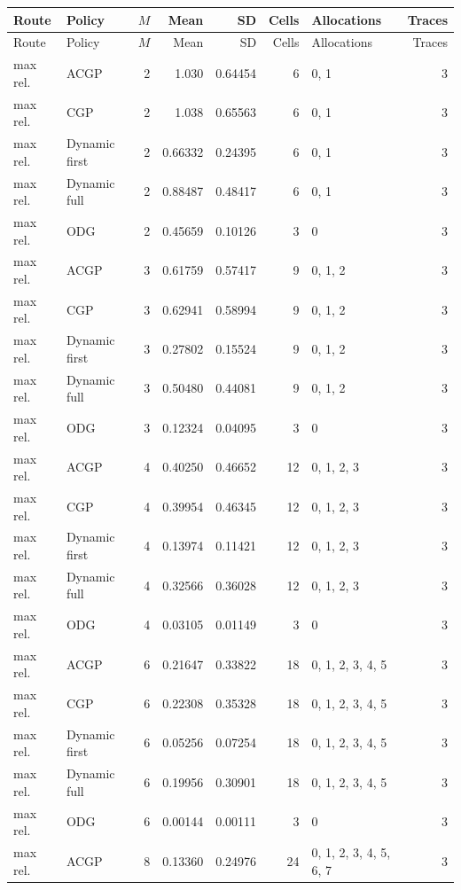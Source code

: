 \documentclass[10pt,a4paper]{article}
\begin{document}
\tiny\setlength{\tabcolsep}{2pt}\begin{longtable}{@{}p{23mm}p{29mm}rrrrp{36mm}r@{}}
\toprule Route & Policy & $M$ & Mean & SD & Cells & Allocations & Traces \\ \midrule\endfirsthead
\toprule Route & Policy & $M$ & Mean & SD & Cells & Allocations & Traces \\ \midrule\endhead
\bottomrule\endfoot
max rel. & ACGP & 2 & 1.030 & 0.64454 & 6 & 0, 1 & 3 \\
max rel. & CGP & 2 & 1.038 & 0.65563 & 6 & 0, 1 & 3 \\
max rel. & Dynamic first & 2 & 0.66332 & 0.24395 & 6 & 0, 1 & 3 \\
max rel. & Dynamic full & 2 & 0.88487 & 0.48417 & 6 & 0, 1 & 3 \\
max rel. & ODG & 2 & 0.45659 & 0.10126 & 3 & 0 & 3 \\
max rel. & ACGP & 3 & 0.61759 & 0.57417 & 9 & 0, 1, 2 & 3 \\
max rel. & CGP & 3 & 0.62941 & 0.58994 & 9 & 0, 1, 2 & 3 \\
max rel. & Dynamic first & 3 & 0.27802 & 0.15524 & 9 & 0, 1, 2 & 3 \\
max rel. & Dynamic full & 3 & 0.50480 & 0.44081 & 9 & 0, 1, 2 & 3 \\
max rel. & ODG & 3 & 0.12324 & 0.04095 & 3 & 0 & 3 \\
max rel. & ACGP & 4 & 0.40250 & 0.46652 & 12 & 0, 1, 2, 3 & 3 \\
max rel. & CGP & 4 & 0.39954 & 0.46345 & 12 & 0, 1, 2, 3 & 3 \\
max rel. & Dynamic first & 4 & 0.13974 & 0.11421 & 12 & 0, 1, 2, 3 & 3 \\
max rel. & Dynamic full & 4 & 0.32566 & 0.36028 & 12 & 0, 1, 2, 3 & 3 \\
max rel. & ODG & 4 & 0.03105 & 0.01149 & 3 & 0 & 3 \\
max rel. & ACGP & 6 & 0.21647 & 0.33822 & 18 & 0, 1, 2, 3, 4, 5 & 3 \\
max rel. & CGP & 6 & 0.22308 & 0.35328 & 18 & 0, 1, 2, 3, 4, 5 & 3 \\
max rel. & Dynamic first & 6 & 0.05256 & 0.07254 & 18 & 0, 1, 2, 3, 4, 5 & 3 \\
max rel. & Dynamic full & 6 & 0.19956 & 0.30901 & 18 & 0, 1, 2, 3, 4, 5 & 3 \\
max rel. & ODG & 6 & 0.00144 & 0.00111 & 3 & 0 & 3 \\
max rel. & ACGP & 8 & 0.13360 & 0.24976 & 24 & 0, 1, 2, 3, 4, 5, 6, 7 & 3 \\

\end{longtable}
\end{document}
